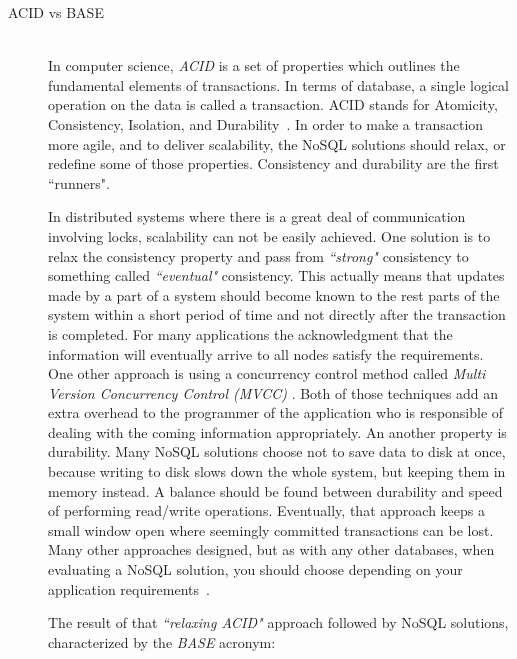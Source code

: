 \begin{description}
  \item[ACID vs BASE] \hfill \\
    In computer science, \emph{ACID} is a set of properties which outlines the
    fundamental elements of transactions. In terms of database, a single
    logical operation on the data is called a transaction. ACID stands for
    Atomicity, Consistency, Isolation, and
    Durability~. In order to make a
    transaction more agile, and to deliver scalability, the NoSQL solutions
    should relax, or redefine some of those properties. Consistency and
    durability are the first ``runners".

    In distributed systems where there is a great deal of communication involving
    locks, scalability can not be easily achieved. One solution is to relax the
    consistency property and pass from \emph{``strong"} consistency to something
    called \emph{``eventual"} consistency. This actually means that updates made
    by a part of a
    system should become known to the rest parts of the system within a short
    period of time and not directly after the transaction is completed. For many
    applications the acknowledgment that the information will eventually arrive
    to all nodes satisfy the requirements. One other approach is using a concurrency
    control method called \emph{Multi Version Concurrency Control (MVCC)}
    .
    Both of those techniques add an extra overhead to the programmer of
    the application who is responsible of dealing with the coming information
    appropriately. An another property is durability. Many NoSQL solutions
    choose not to save data to disk at once, because writing to disk slows down
    the whole system, but keeping them in memory instead. A balance should be
    found between durability and speed of performing read/write operations.
    Eventually, that approach keeps a small window open where seemingly committed
    transactions can be lost. Many other approaches designed, but as with any
    other databases, when evaluating a NoSQL solution, you should choose depending
    on your application requirements~\cite{burd}.

    The result of that \emph{``relaxing ACID"} approach followed by NoSQL
    solutions, characterized by the \emph{BASE} acronym:


\end{description}
